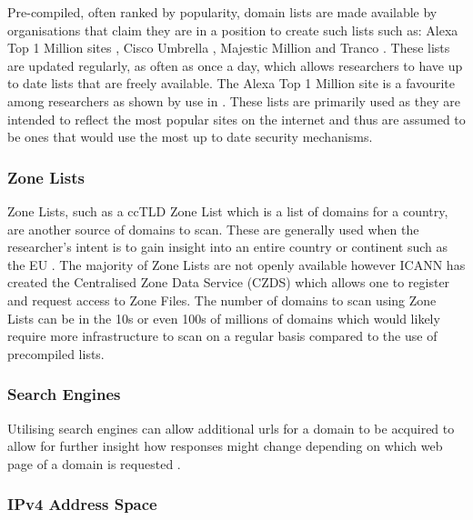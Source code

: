 \documentclass{mscreport}
\begin{document}
Pre-compiled, often ranked by popularity, domain lists are made available by organisations that claim they are in a position to create such lists such as: Alexa Top 1 Million sites \cite{noauthor_undated-wh}, Cisco Umbrella \cite{noauthor_undated-ku}, Majestic Million \cite{noauthor_undated-sz} and Tranco \cite{noauthor_undated-mt}. These lists are updated regularly, as often as once a day, which allows researchers to have up to date lists that are freely available. The Alexa Top 1 Million site is a favourite among researchers as shown by use in \cite{Buchanan2018-xz,Chen2016-dl,Kumar2017-qw,Patil2017-bg,Ying2016-ag,Michael2015-hn,Van_Goethem2014-ao,Holz2020-ha,Poteat2021-zr}. These lists are primarily used as they are intended to reflect the most popular sites on the internet and thus are assumed to be ones that would use the most up to date security mechanisms.

\subsubsection{Zone Lists}

Zone Lists, such as a ccTLD Zone List which is a list of domains for a country, are another source of domains to scan. These are generally used when the researcher’s intent is to gain insight into an entire country or continent such as the EU \cite{Amann2017-co,Chen2016-dl,Van_Goethem2014-ao,Holz2020-ha}. The majority of Zone Lists are not openly available however ICANN has created the Centralised Zone Data Service (CZDS) \cite{noauthor_undated-mm} which allows one to register and request access to Zone Files. The number of domains to scan using Zone Lists can be in the 10s or even 100s of millions of domains which would likely require more infrastructure to scan on a regular basis compared to the use of precompiled lists.

\subsubsection{Search Engines}

Utilising search engines can allow additional urls for a domain to be acquired to allow for further insight how responses might change depending on which web page of a domain is requested \cite{Chen2016-dl}.

\subsubsection{IPv4 Address Space}
\end{document}
